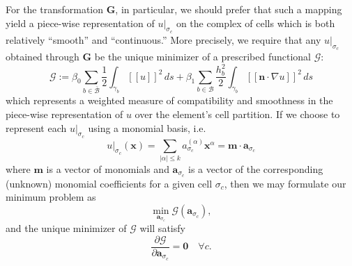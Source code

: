For the transformation $\mathbf{G}$, in particular, we should prefer that such a mapping yield a piece-wise representation of $u|_{\sigma_c}$ on the complex of cells which is both relatively ``smooth'' and ``continuous.'' More precisely, we require that any $u|_{\sigma_c}$ obtained through $\mathbf{G}$ be the unique minimizer of a prescribed functional $\mathcal{G}$:
\begin{equation}
        \mathcal{G} := \beta_0 \sum_{b \in \bar{\mathcal{B}}} \frac{1}{2} \int_{\gamma_b} [\![ u ]\!]^2 \, ds + \beta_1 \sum_{b \in \mathcal{B}} \frac{h_b^2}{2} \int_{\gamma_b} [\![ \mathbf{n} \cdot \nabla u ]\!]^2 \, ds
\end{equation}
which represents a weighted measure of compatibility and smoothness in the piece-wise representation of $u$ over the element's cell partition. If we choose to represent each $u|_{\sigma_c}$ using a monomial basis, i.e.
\begin{equation}
     u |_{\sigma_c} (\mathbf{x}) = \sum_{|\alpha| \leq k} a_{\sigma_c}^{(\alpha)} \mathbf{x}^{\alpha} = \mathbf{m} \cdot \mathbf{a}_{\sigma_c}
\end{equation}
where $\mathbf{m}$ is a vector of monomials and $\mathbf{a}_{\sigma_c}$ is a vector of the corresponding (unknown) monomial coefficients for a given cell $\sigma_c$, then we may formulate our minimum problem as
\begin{equation}
        \min_{\mathbf{a}_{\sigma_c}} \mathcal{G} (\mathbf{a}_{\sigma_c}),
\end{equation}
and the unique minimizer of $\mathcal{G}$ will satisfy
\begin{equation}
        \frac{\partial \mathcal{G}}{\partial \mathbf{a}_{\sigma_c}} = \mathbf{0} \quad \forall c.
\end{equation}

